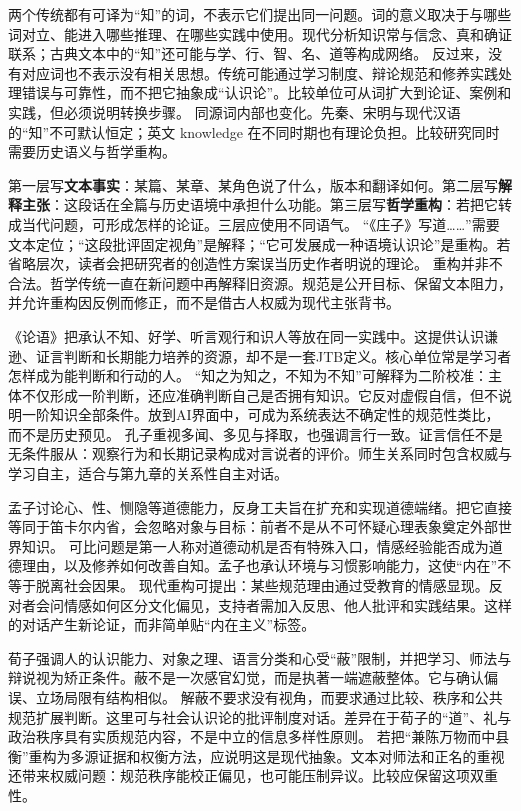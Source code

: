 两个传统都有可译为“知”的词，不表示它们提出同一问题。词的意义取决于与哪些词对立、能进入哪些推理、在哪些实践中使用。现代分析知识常与信念、真和确证联系；古典文本中的“知”还可能与学、行、智、名、道等构成网络。 反过来，没有对应词也不表示没有相关思想。传统可能通过学习制度、辩论规范和修养实践处理错误与可靠性，而不把它抽象成“认识论”。比较单位可从词扩大到论证、案例和实践，但必须说明转换步骤。 同源词内部也变化。先秦、宋明与现代汉语的“知”不可默认恒定；英文 knowledge 在不同时期也有理论负担。比较研究同时需要历史语义与哲学重构。

第一层写\textbf{文本事实}：某篇、某章、某角色说了什么，版本和翻译如何。第二层写\textbf{解释主张}：这段话在全篇与历史语境中承担什么功能。第三层写\textbf{哲学重构}：若把它转成当代问题，可形成怎样的论证。三层应使用不同语气。 “《庄子》写道……”需要文本定位；“这段批评固定视角”是解释；“它可发展成一种语境认识论”是重构。若省略层次，读者会把研究者的创造性方案误当历史作者明说的理论。 重构并非不合法。哲学传统一直在新问题中再解释旧资源。规范是公开目标、保留文本阻力，并允许重构因反例而修正，而不是借古人权威为现代主张背书。

《论语》把承认不知、好学、听言观行和识人等放在同一实践中\parencite{analects2003}。这提供认识谦逊、证言判断和长期能力培养的资源，却不是一套JTB定义。核心单位常是学习者怎样成为能判断和行动的人。 “知之为知之，不知为不知”可解释为二阶校准\parencite[2.17]{analects2003}：主体不仅形成一阶判断，还应准确判断自己是否拥有知识。它反对虚假自信，但不说明一阶知识全部条件。放到AI界面中，可成为系统表达不确定性的规范性类比，而不是历史预见。 孔子重视多闻、多见与择取，也强调言行一致。证言信任不是无条件服从：观察行为和长期记录构成对言说者的评价。师生关系同时包含权威与学习自主，适合与第九章的关系性自主对话。

孟子讨论心、性、恻隐等道德能力，反身工夫旨在扩充和实现道德端绪\parencite{mencius2008}。把它直接等同于笛卡尔内省，会忽略对象与目标：前者不是从不可怀疑心理表象奠定外部世界知识。 可比问题是第一人称对道德动机是否有特殊入口，情感经验能否成为道德理由，以及修养如何改善自知。孟子也承认环境与习惯影响能力，这使“内在”不等于脱离社会因果。 现代重构可提出：某些规范理由通过受教育的情感显现。反对者会问情感如何区分文化偏见，支持者需加入反思、他人批评和实践结果。这样的对话产生新论证，而非简单贴“内在主义”标签。

荀子强调人的认识能力、对象之理、语言分类和心受“蔽”限制，并把学习、师法与辩说视为矫正条件\parencite{xunzi2014}。蔽不是一次感官幻觉，而是执著一端遮蔽整体。它与确认偏误、立场局限有结构相似。 解蔽不要求没有视角，而要求通过比较、秩序和公共规范扩展判断。这里可与社会认识论的批评制度对话。差异在于荀子的“道”、礼与政治秩序具有实质规范内容，不是中立的信息多样性原则。 若把“兼陈万物而中县衡”重构为多源证据和权衡方法，应说明这是现代抽象\parencite[chap.~21]{xunzi2014}。文本对师法和正名的重视还带来权威问题：规范秩序能校正偏见，也可能压制异议。比较应保留这项双重性。

